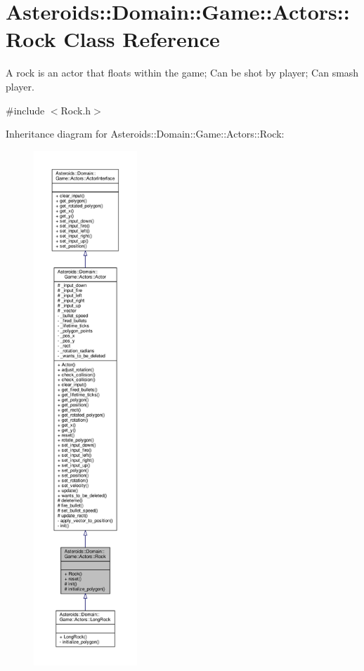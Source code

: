 \hypertarget{classAsteroids_1_1Domain_1_1Game_1_1Actors_1_1Rock}{}\section{Asteroids\+:\+:Domain\+:\+:Game\+:\+:Actors\+:\+:Rock Class Reference}
\label{classAsteroids_1_1Domain_1_1Game_1_1Actors_1_1Rock}


A rock is an actor that floats within the game; Can be shot by player; Can smash player.  




{\ttfamily \#include $<$Rock.\+h$>$}



Inheritance diagram for Asteroids\+:\+:Domain\+:\+:Game\+:\+:Actors\+:\+:Rock\+:\nopagebreak
\begin{figure}[H]
\begin{center}
\leavevmode
\includegraphics[height=550pt]{classAsteroids_1_1Domain_1_1Game_1_1Actors_1_1Rock__inherit__graph}
\end{center}
\end{figure}


